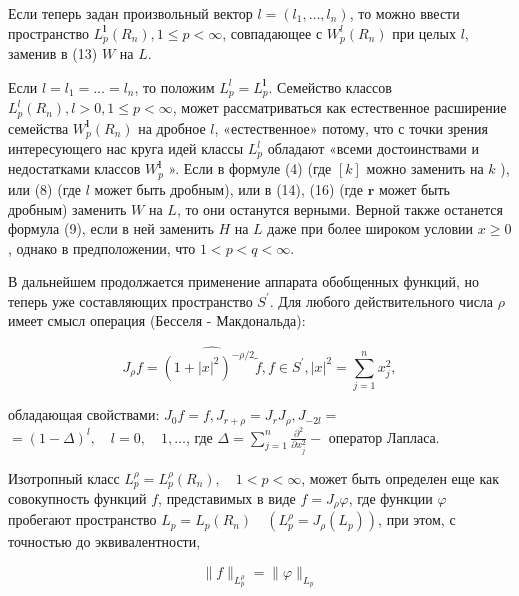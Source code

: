 \documentclass[10pt]{article}
\begin{document}
Если теперь задан произвольный вектор $l=\left(l_{1}, \ldots, l_{n}\right)$, то можно ввести пространство $L_{p}^{\boldsymbol{l}}\left(R_{n}\right), 1 \leqslant p<\infty$, совпадающее с $W_{p}^{l}\left(R_{n}\right)$ при целых $l$, заменив в (13) $W$ на $L$.



Если $l=l_{1}=\ldots=l_{n}$, то положим $L_{p}^{l}=L_{p}^{\boldsymbol{l}}$. Семейство классов $L_{p}^{l}\left(R_{n}\right), l>0,1 \leqslant p<\infty$, может рассматриваться как естественное расширение семейства $W_{p}^{\boldsymbol{l}}\left(R_{n}\right)$ на дробное $l$, «естественное» потому, что с точки зрения интересующего нас круга идей классы $L_{p}^{l}$ обладают «всеми достоинствами и недостатками классов $W_{p}^{\boldsymbol{l}}$ ». Если в формуле (4) (где $[k]$ можно заменить на $k$ ), или (8) (где $l$ может быть дробным), или в (14), (16) (где $\boldsymbol{r}$ может быть дробным) заменить $W$ на $L$, то они останутся верными. Верной также останется формула (9), если в ней заменить $H$ на $L$ даже при более широком условии $x \geqslant 0$, однако в предположении, что $1<p<q<\infty$.



В дальнейшем продолжается применение аппарата обобщенных функций, но теперь уже составляющих пространство $S^{\prime}$. Для любого действительного числа $\rho$ имеет смысл операция (Бесселя - Макдональда):



\[

J_{\rho} f=\widehat{\left(1+|x|^{2}\right)^{-\rho / 2} \tilde{f}}, f \in S^{\prime},|x|^{2}=\sum_{j=1}^{n} x_{j}^{2},

\]



обладающая свойствами: $J_{0} f=f, J_{r+\rho}=J_{r} J_{\rho}, J_{-2 l}=$ $=(1-\Delta)^{l}, \quad l=0, \quad 1, \ldots$, где $\Delta=\sum_{j=1}^{n} \frac{\partial^{2}}{\partial x_{j}^{2}}-$ оператор Лапласа.



Изотропный класс $L_{p}^{\rho}=L_{p}^{\rho}\left(R_{n}\right), \quad 1<p<\infty$, может быть определен еще как совокупность функций $f$, представимых в виде $f=J_{\rho} \varphi$, где функции $\varphi$ пробегают пространство $L_{p}=L_{p}\left(R_{n}\right) \quad\left(L_{p}^{\rho}=J_{\rho}\left(L_{p}\right)\right)$, при этом, с точностью до эквивалентности,



\[

\|f\|_{L_{p}^{\rho}}=\|\varphi\|_{L_{p}}

\]
\end{document}
